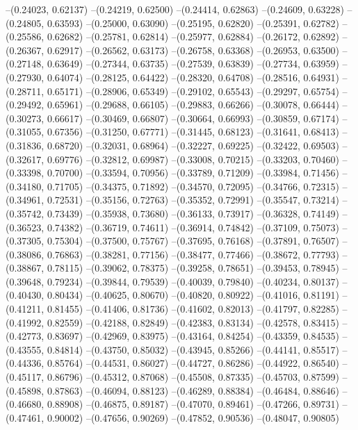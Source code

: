 --(0.24023, 0.62137)
--(0.24219, 0.62500)
--(0.24414, 0.62863)
--(0.24609, 0.63228)
--(0.24805, 0.63593)
--(0.25000, 0.63090)
--(0.25195, 0.62820)
--(0.25391, 0.62782)
--(0.25586, 0.62682)
--(0.25781, 0.62814)
--(0.25977, 0.62884)
--(0.26172, 0.62892)
--(0.26367, 0.62917)
--(0.26562, 0.63173)
--(0.26758, 0.63368)
--(0.26953, 0.63500)
--(0.27148, 0.63649)
--(0.27344, 0.63735)
--(0.27539, 0.63839)
--(0.27734, 0.63959)
--(0.27930, 0.64074)
--(0.28125, 0.64422)
--(0.28320, 0.64708)
--(0.28516, 0.64931)
--(0.28711, 0.65171)
--(0.28906, 0.65349)
--(0.29102, 0.65543)
--(0.29297, 0.65754)
--(0.29492, 0.65961)
--(0.29688, 0.66105)
--(0.29883, 0.66266)
--(0.30078, 0.66444)
--(0.30273, 0.66617)
--(0.30469, 0.66807)
--(0.30664, 0.66993)
--(0.30859, 0.67174)
--(0.31055, 0.67356)
--(0.31250, 0.67771)
--(0.31445, 0.68123)
--(0.31641, 0.68413)
--(0.31836, 0.68720)
--(0.32031, 0.68964)
--(0.32227, 0.69225)
--(0.32422, 0.69503)
--(0.32617, 0.69776)
--(0.32812, 0.69987)
--(0.33008, 0.70215)
--(0.33203, 0.70460)
--(0.33398, 0.70700)
--(0.33594, 0.70956)
--(0.33789, 0.71209)
--(0.33984, 0.71456)
--(0.34180, 0.71705)
--(0.34375, 0.71892)
--(0.34570, 0.72095)
--(0.34766, 0.72315)
--(0.34961, 0.72531)
--(0.35156, 0.72763)
--(0.35352, 0.72991)
--(0.35547, 0.73214)
--(0.35742, 0.73439)
--(0.35938, 0.73680)
--(0.36133, 0.73917)
--(0.36328, 0.74149)
--(0.36523, 0.74382)
--(0.36719, 0.74611)
--(0.36914, 0.74842)
--(0.37109, 0.75073)
--(0.37305, 0.75304)
--(0.37500, 0.75767)
--(0.37695, 0.76168)
--(0.37891, 0.76507)
--(0.38086, 0.76863)
--(0.38281, 0.77156)
--(0.38477, 0.77466)
--(0.38672, 0.77793)
--(0.38867, 0.78115)
--(0.39062, 0.78375)
--(0.39258, 0.78651)
--(0.39453, 0.78945)
--(0.39648, 0.79234)
--(0.39844, 0.79539)
--(0.40039, 0.79840)
--(0.40234, 0.80137)
--(0.40430, 0.80434)
--(0.40625, 0.80670)
--(0.40820, 0.80922)
--(0.41016, 0.81191)
--(0.41211, 0.81455)
--(0.41406, 0.81736)
--(0.41602, 0.82013)
--(0.41797, 0.82285)
--(0.41992, 0.82559)
--(0.42188, 0.82849)
--(0.42383, 0.83134)
--(0.42578, 0.83415)
--(0.42773, 0.83697)
--(0.42969, 0.83975)
--(0.43164, 0.84254)
--(0.43359, 0.84535)
--(0.43555, 0.84814)
--(0.43750, 0.85032)
--(0.43945, 0.85266)
--(0.44141, 0.85517)
--(0.44336, 0.85764)
--(0.44531, 0.86027)
--(0.44727, 0.86286)
--(0.44922, 0.86540)
--(0.45117, 0.86796)
--(0.45312, 0.87068)
--(0.45508, 0.87335)
--(0.45703, 0.87599)
--(0.45898, 0.87863)
--(0.46094, 0.88123)
--(0.46289, 0.88384)
--(0.46484, 0.88646)
--(0.46680, 0.88908)
--(0.46875, 0.89187)
--(0.47070, 0.89461)
--(0.47266, 0.89731)
--(0.47461, 0.90002)
--(0.47656, 0.90269)
--(0.47852, 0.90536)
--(0.48047, 0.90805)
